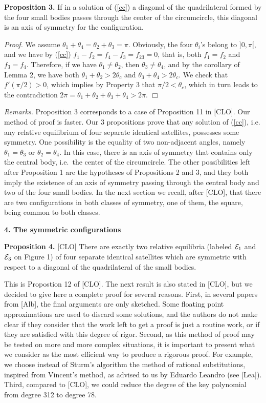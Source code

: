 \documentclass[11pt]{article}
\begin{document}
{\bf Proposition 3.} If in a solution of (\ref{cc}) a diagonal of
the quadrilateral formed by the four small bodies passes through the center of the circumcircle, this diagonal is an axis of symmetry for the configuration.

{\sl Proof.} We assume
$\theta_1+\theta_4=\theta_2+\theta_3=\pi$. Obviously, the four
$\theta_i$'s  belong to $]0,\pi[$, and we have by (\ref{cc})
$f_1-f_2=f_4-f_3=f_{23}=0$, that is, both $f_1=f_2$ and $f_3=f_4$. Therefore, if we have $\theta_1\neq\theta_2$, then
$\theta_3\neq\theta_4$, and by the corollary of Lemma 2, we have both
$\theta_1+\theta_2>2\theta_c$ and $\theta_3+\theta_4>2\theta_c$.  We check that $f'(\pi/2)>0$, which implies by Property 3 that $\pi/2<\theta_c$, which in turn leads to the
contradiction $2\pi=\theta_1+\theta_2+\theta_3+\theta_4>2\pi$. $\Box$

{\sl Remarks.} Proposition 3 corresponds to a case of Proposition 11
in [CLO]. Our method of proof is faster. Our 3 propositions prove
that any solution of (\ref{cc}), i.e. any relative equilibrium of
four separate identical satellites, possesses some symmetry. One
possibility is the equality of two non-adjacent angles, namely
$\theta_1=\theta_3$ or $\theta_2=\theta_4$. In this case, there is
an axis of symmetry that contains only the central body, i.e.\ the
center of the circumcircle. The other possibilities left after
Proposition 1 are the hypotheses of Propositions 2 and 3, and they
both imply the existence of an axis of symmetry passing through the
central body and two of the four small bodies. In the next section
we recall, after [CLO], that there are two configurations in both
classes of symmetry, one of them, the square, being common to both
classes.


\bigskip
\centerline{\bf 4. The symmetric configurations}

{\bf Proposition 4.} [CLO] There are exactly two relative equilibria  (labeled ${\cal E}_1$ and ${\cal E}_3$ on Figure 1) of four separate identical satellites which are symmetric with respect to a diagonal of the quadrilateral of the small bodies.

This is Propostion 12 of [CLO]. The next result is also stated in
[CLO], but we decided to give here a complete proof for several
reasons. First, in several papers from [Alb], the final arguments
are only sketched. Some floating point approximations are used to
discard some solutions, and the authors do not make clear if they
consider that the work left to get a proof is just a routine work,
or if they are satisfied with this degree of rigor. Second, as this
method of proof may be tested on more and more complex situations,
it is important to present what we consider as the most efficient
way to produce a rigorous proof. For example, we choose instead of
Sturm's algorithm the method of rational substitutions, inspired
from Vincent's method, as advised to us by Eduardo Leandro (see
[Lea]). Third, compared to [CLO], we could reduce the degree of the
key polynomial from degree 312 to degree 78.
\end{document}
